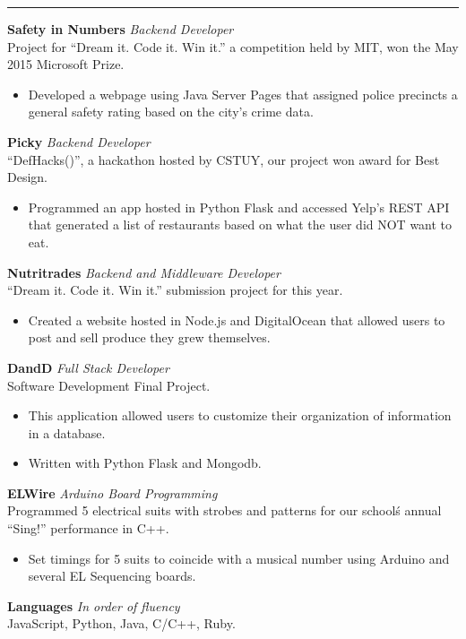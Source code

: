 \documentclass[14, .75in]{article}
\begin{document}
  \vspace{0.1cm} \hrule \vspace{0.3cm}
  \noindent\textbf{Safety in Numbers}\textit{ Backend Developer}\\
  Project for ``Dream it. Code it. Win it.'' a competition held by MIT, won the May 2015 Microsoft Prize.
  \begin{itemize}[label={--},noitemsep, topsep=0pt]
    \item Developed a webpage using Java Server Pages that assigned police precincts a general safety rating based on the city's crime data.
  \end{itemize}
  \textbf{Picky}\textit{ Backend Developer}\\ ``DefHacks()'', a hackathon hosted by CSTUY, our project won award for Best Design.
  \begin{itemize}[label={--},noitemsep, topsep=0pt]
    \item Programmed an app hosted in Python Flask and accessed Yelp's REST API that generated a list of restaurants based on what the user did NOT want to eat.
  \end{itemize}
  \textbf{Nutritrades}\textit{ Backend and Middleware Developer}\\
  ``Dream it. Code it. Win it.'' submission project for this year.
  \begin{itemize}[label={--},noitemsep, topsep=0pt]
    \item Created a website hosted in Node.js and DigitalOcean that allowed users to post and sell produce they grew themselves.
  \end{itemize}
  \textbf{DandD}\textit{ Full Stack Developer}\\
  Software Development Final Project.
  \begin{itemize}[label={--},noitemsep, topsep=0pt]
    \item This application allowed users to customize their organization of information in a database.
    \item Written with Python Flask and Mongodb.
  \end{itemize}
  \textbf{ELWire}\textit{ Arduino Board Programming}\\
  Programmed 5 electrical suits with strobes and patterns for our school\'s annual ``Sing!'' performance in C++.
  \begin{itemize}[label={--},noitemsep, topsep=0pt]
    \item Set timings for 5 suits to coincide with a musical number using Arduino and several EL Sequencing boards.
  \end{itemize}
  \textbf{Languages}\textit{ In order of fluency}\\
  JavaScript, Python, Java, C/C++, Ruby.
\end{document}
